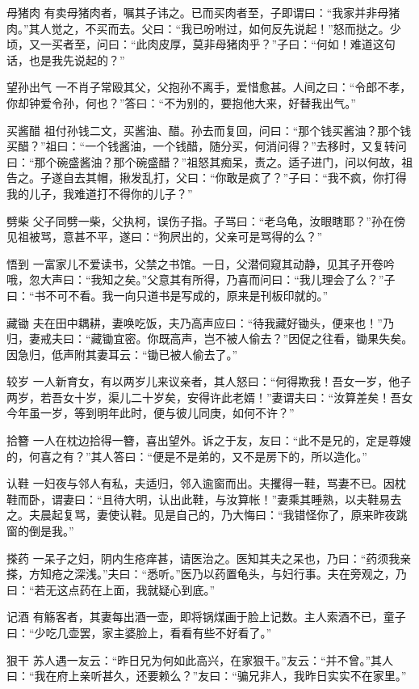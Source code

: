 \documentclass[12pt,UTF8]{ctexbook}
\begin{document}
母猪肉
有卖母猪肉者，嘱其子讳之。已而买肉者至，子即谓曰：“我家并非母猪肉。”其人觉之，不买而去。父曰：“我已吩咐过，如何反先说起！”怒而挞之。少顷，又一买者至，问曰：“此肉皮厚，莫非母猪肉乎？”子曰：“何如！难道这句话，也是我先说起的？”

望孙出气
一不肖子常殴其父，父抱孙不离手，爱惜愈甚。人间之曰：“令郎不孝，你却钟爱令孙，何也？”答曰：“不为别的，要抱他大来，好替我出气。”

买酱醋
祖付孙钱二文，买酱油、醋。孙去而复回，问曰：“那个钱买酱油？那个钱买醋？”祖曰：“一个钱酱油，一个钱醋，随分买，何消问得？”去移时，又复转问曰：“那个碗盛酱油？那个碗盛醋？”祖怒其痴呆，责之。适子进门，问以何故，祖告之。子遂自去其帽，揪发乱打，父曰：“你敢是疯了？”子曰：“我不疯，你打得我的儿子，我难道打不得你的儿子？”

劈柴
父子同劈一柴，父执柯，误伤子指。子骂曰：“老乌龟，汝眼瞎耶？”孙在傍见祖被骂，意甚不平，遂曰：“狗屄出的，父亲可是骂得的么？”

悟到
一富家儿不爱读书，父禁之书馆。一日，父潜伺窥其动静，见其子开卷吟哦，忽大声曰：“我知之矣。”父意其有所得，乃喜而问曰：“我儿理会了么？”子曰：“书不可不看。我一向只道书是写成的，原来是刊板印就的。”

藏锄
夫在田中耦耕，妻唤吃饭，夫乃高声应曰：“待我藏好锄头，便来也！”乃归，妻戒夫曰：“藏锄宜密。你既高声，岂不被人偷去？”因促之往看，锄果失矣。因急归，低声附其妻耳云：“锄已被人偷去了。”

较岁
一人新育女，有以两岁儿来议亲者，其人怒曰：“何得欺我！吾女一岁，他子两岁，若吾女十岁，渠儿二十岁矣，安得许此老婿！”妻谓夫曰：“汝算差矣！吾女今年虽一岁，等到明年此时，便与彼儿同庚，如何不许？”

拾簪
一人在枕边拾得一簪，喜出望外。诉之于友，友曰：“此不是兄的，定是尊嫂的，何喜之有？”其人答曰：“便是不是弟的，又不是房下的，所以造化。”

认鞋
一妇夜与邻人有私，夫适归，邻入逾窗而出。夫攫得一鞋，骂妻不已。因枕鞋而卧，谓妻曰：“且待大明，认出此鞋，与汝算帐！”妻乘其睡熟，以夫鞋易去之。夫晨起复骂，妻使认鞋。见是自己的，乃大悔曰：“我错怪你了，原来昨夜跳窗的倒是我。”

搽药
一呆子之妇，阴内生疮痒甚，请医治之。医知其夫之呆也，乃曰：“药须我亲搽，方知疮之深浅。”夫曰：“悉听。”医乃以药置龟头，与妇行事。夫在旁观之，乃曰：“若无这点药在上面，我就疑心到底。”

记酒
有觞客者，其妻每出酒一壶，即将锅煤画于脸上记数。主人索酒不已，童子曰：“少吃几壶罢，家主婆脸上，看看有些不好看了。”

狠干
苏人遇一友云：“昨日兄为何如此高兴，在家狠干。”友云：“并不曾。”其人曰：“我在府上亲听甚久，还要赖么？”友曰：“骗兄非人，我昨日实实不在家里。”
\end{document}
